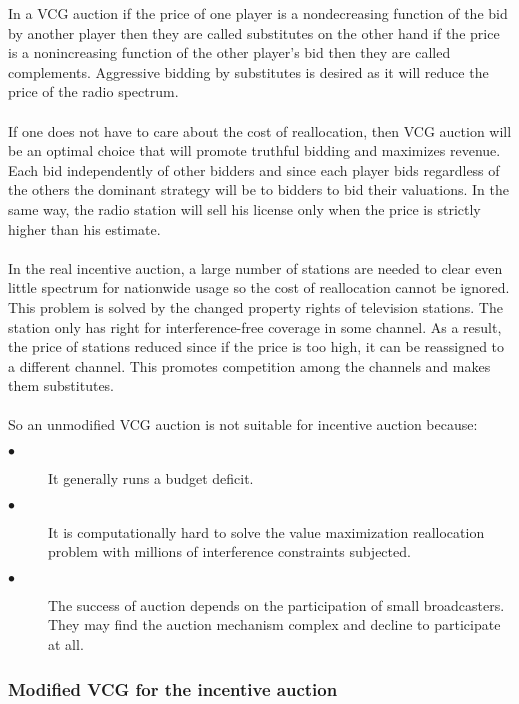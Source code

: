\documentclass[a4paper]{article}
\begin{document}
In a VCG auction if the price of one player is a nondecreasing function of the bid by another player then they are called substitutes on the other hand if the price is a nonincreasing function of the other player's bid then they are called complements. Aggressive bidding by substitutes is desired as it will reduce the price of the radio spectrum.
\\\\
If one does not have to care about the cost of reallocation, then VCG auction will be an optimal choice that will promote truthful bidding and maximizes revenue. Each bid independently of other bidders and since each player bids regardless of the others the dominant strategy will be to bidders to bid their valuations. In the same way, the radio station will sell his license only when the price is strictly higher than his estimate.
\\\\
In the real incentive auction, a large number of stations are needed to clear even little spectrum for nationwide usage so the cost of reallocation cannot be ignored. This problem is solved by the changed property rights of television stations. The station only has right for interference-free coverage in some channel. As a result, the price of stations reduced since if the price is too high, it can be reassigned to a different channel. This promotes competition among the channels and makes them substitutes.
\\\\
So an unmodified VCG auction is not suitable for incentive auction because:

\begin{description}

\item[$\bullet$] It generally runs a budget deficit.
\item[$\bullet$] It is computationally hard to solve the value maximization reallocation problem with millions of interference constraints subjected.
\item[$\bullet$] The success of auction depends on the participation of small broadcasters. They may find the auction mechanism complex and decline to participate at all.

\end{description}

\pagebreak
\subsubsection*{Modified VCG for the incentive auction}
\end{document}
